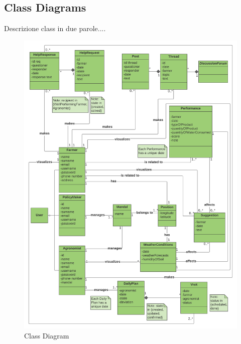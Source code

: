 \subsection{Class Diagrams}
Descrizione class in due parole....

\begin{figure}[h!]
  \includegraphics[width=\textwidth,height=\textheight,keepaspectratio]{./Images/Class Diagram DREAM.png}
  \caption{Class Diagram}
\end{figure}
\newpage


